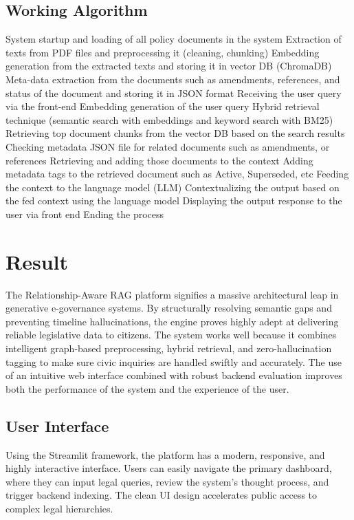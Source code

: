 \documentclass[conference]{IEEEtran}
\begin{document}
\subsection{Working Algorithm}
\begin{algorithmic}[1]
\STATE System startup and loading of all policy documents in the system
\STATE Extraction of texts from PDF files and preprocessing it (cleaning, chunking)
\STATE Embedding generation from the extracted texts and storing it in vector DB (ChromaDB)
\STATE Meta-data extraction from the documents such as amendments, references, and status of the document and storing it in JSON format
\STATE Receiving the user query via the front-end
\STATE Embedding generation of the user query
\STATE Hybrid retrieval technique (semantic search with embeddings and keyword search with BM25)
\STATE Retrieving top document chunks from the vector DB based on the search results
\STATE Checking metadata JSON file for related documents such as amendments, or references
\STATE Retrieving and adding those documents to the context
\STATE Adding metadata tags to the retrieved document such as Active, Superseded, etc
\STATE Feeding the context to the language model (LLM)
\STATE Contextualizing the output based on the fed context using the language model
\STATE Displaying the output response to the user via front end
\STATE Ending the process
\end{algorithmic}

\section{Result}
The Relationship-Aware RAG platform signifies a massive architectural leap in generative e-governance systems. By structurally resolving semantic gaps and preventing timeline hallucinations, the engine proves highly adept at delivering reliable legislative data to citizens. The system works well because it combines intelligent graph-based preprocessing, hybrid retrieval, and zero-hallucination tagging to make sure civic inquiries are handled swiftly and accurately. The use of an intuitive web interface combined with robust backend evaluation improves both the performance of the system and the experience of the user.

\subsection{User Interface}
Using the Streamlit framework, the platform has a modern, responsive, and highly interactive interface. Users can easily navigate the primary dashboard, where they can input legal queries, review the system's thought process, and trigger backend indexing. The clean UI design accelerates public access to complex legal hierarchies.
\end{document}
